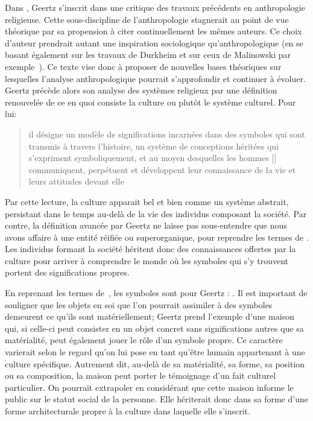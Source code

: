 Dans , Geertz s'inscrit dans une critique des travaux précédents en anthropologie religieuse. 
Cette sous-discipline de l'anthropologie stagnerait au point de vue théorique par sa propension à citer continuellement les mêmes auteurs. 
Ce choix d'auteur prendrait autant une inspiration sociologique qu'anthropologique (en se basant également sur les travaux de Durkheim et sur ceux de Malinowski par exemple~\citep[20]{Geertz1972}). 
Ce texte vise donc à proposer de nouvelles bases théoriques sur lesquelles l'analyse anthropologique pourrait s'approfondir et continuer à évoluer. 
Geertz précède alors son analyse des systèmes religieux par une définition renouvelée de ce en quoi consiste la culture ou plutôt le système culturel. 
Pour lui: \blockquote[{\cite[21]{Geertz1972}}][.]{\textelp{} il désigne un modèle de significations incarnées dans des symboles qui sont transmis à travers l'histoire, un système de conceptions héritées qui s'expriment symboliquement, et au moyen desquelles les hommes [] communiquent, perpétuent et développent leur connaissance de la vie et leurs attitudes devant elle}.

Par cette lecture, la culture apparait bel et bien comme un système abstrait, persistant dans le temps au-delà de la vie des individus composant la société. 
Par contre, la définition avancée par Geertz ne laisse pas sous-entendre que nous avons affaire à une entité réifiée ou superorganique, pour reprendre les termes de \citet{Duncan1980}. 
Les individus formant la société héritent donc des connaissances offertes par la culture pour arriver à comprendre le monde où les symboles qui s'y trouvent portent des significations propres.

En reprenant les termes de~\cite{Langer1962}, les symboles sont pour Geertz : . 
Il est important de souligner que les objets en soi que l'on pourrait assimiler à des symboles demeurent ce qu'ils sont matériellement; Geertz prend l'exemple d'une maison qui, si celle-ci peut consister en un objet concret sans significations autres que sa matérialité, peut également jouer le rôle d'un symbole propre. 
Ce caractère varierait selon le regard qu'on lui pose en tant qu'être humain appartenant à une culture spécifique. 
Autrement dit, au-delà de sa matérialité, sa forme, sa position ou sa composition, la maison peut porter le témoignage d'un fait culturel particulier. 
On pourrait extrapoler en considérant que cette maison informe le public sur le statut social de la personne. 
 Elle hériterait donc dans sa forme d'une forme architecturale propre à la culture dans laquelle elle s'inscrit.

